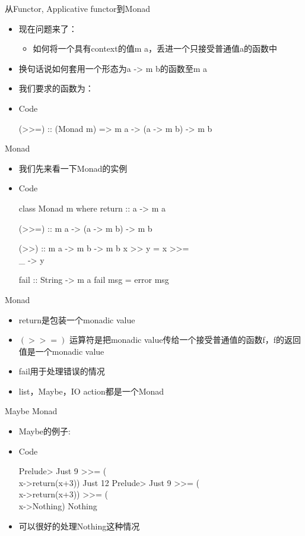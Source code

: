 \documentclass[xcolor=dvipsnames, 11pt]{beamer}
\newenvironment{code}{\begin{block}{Code}\begin{semiverbatim} \begin{footnotesize}}{\end{footnotesize}\end{semiverbatim}\end{block}}
\newenvironment{iit}{\begin{itemize}\setlength{\itemsep}{0.2cm}}{\end{itemize}}
\begin{document}
\begin{frame}[fragile]{从Functor, Applicative functor到Monad}
\begin{iit}
\item<2->现在问题来了：
\begin{iit}
\item<3->如何将一个具有context的值m a，丢进一个只接受普通值a的函数中
\end{iit}
\item<4->换句话说如何套用一个形态为a -> m b的函数至m a
\item<5->我们要求的函数为：
\item<6->[]\begin{code}
(>>=) :: (Monad m) => m a -> (a -> m b) -> m b
\end{code}
\end{iit}
\end{frame}

\begin{frame}[fragile]{Monad}
\begin{iit}
\item<2->我们先来看一下Monad的实例
\item<3->[]\begin{code}
class Monad m where   
    return :: a -> m a   
 
    (>>=) :: m a -> (a -> m b) -> m b   
 
    (>>) :: m a -> m b -> m b   
    x >> y = x >>= \\_ -> y   
 
    fail :: String -> m a   
    fail msg = error msg
\end{code}
\end{iit}
\end{frame}

\begin{frame}[fragile]{Monad}
\begin{iit}
\item<2->return是包装一个monadic value
\item<3->$(>>=)$ 运算符是把monadic value传给一个接受普通值的函数f，f的返回值是一个monadic value
\item<4->fail用于处理错误的情况
\item<5->list，Maybe，IO action都是一个Monad
\end{iit}
\end{frame}

\begin{frame}[fragile]{Maybe Monad}
\begin{iit}
\item<2->Maybe的例子:
\item<3->[]\begin{code}
Prelude> Just 9 >>= (\\x->return(x+3))
Just 12
Prelude> Just 9 >>= (\\x->return(x+3)) >>= (\\x->Nothing)
Nothing
\end{code}
\item<4->可以很好的处理Nothing这种情况
\end{iit}
\end{frame}
\end{document}
